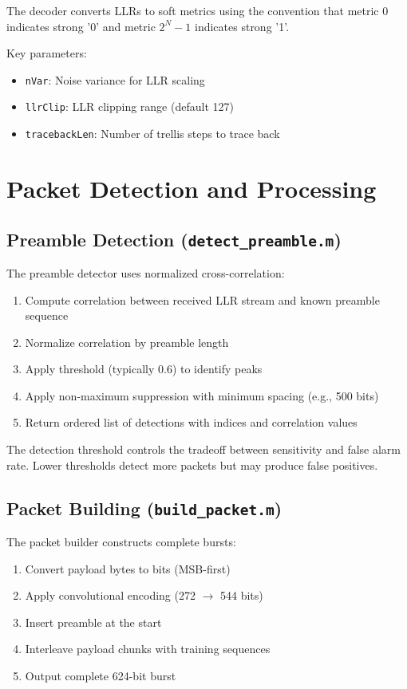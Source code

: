 \documentclass[12pt]{article}
\begin{document}
The decoder converts LLRs to soft metrics using the convention that metric 0 indicates strong '0' and metric $2^N-1$ indicates strong '1'.

Key parameters:
\begin{itemize}
    \item \texttt{nVar}: Noise variance for LLR scaling
    \item \texttt{llrClip}: LLR clipping range (default 127)
    \item \texttt{tracebackLen}: Number of trellis steps to trace back
\end{itemize}

\section{Packet Detection and Processing}

\subsection{Preamble Detection (\texttt{detect\_preamble.m})}
The preamble detector uses normalized cross-correlation:
\begin{enumerate}
    \item Compute correlation between received LLR stream and known preamble sequence
    \item Normalize correlation by preamble length
    \item Apply threshold (typically 0.6) to identify peaks
    \item Apply non-maximum suppression with minimum spacing (e.g., 500 bits)
    \item Return ordered list of detections with indices and correlation values
\end{enumerate}

The detection threshold controls the tradeoff between sensitivity and false alarm rate. Lower thresholds detect more packets but may produce false positives.

\subsection{Packet Building (\texttt{build\_packet.m})}
The packet builder constructs complete bursts:
\begin{enumerate}
    \item Convert payload bytes to bits (MSB-first)
    \item Apply convolutional encoding (272 $\rightarrow$ 544 bits)
    \item Insert preamble at the start
    \item Interleave payload chunks with training sequences
    \item Output complete 624-bit burst
\end{enumerate}
\end{document}
